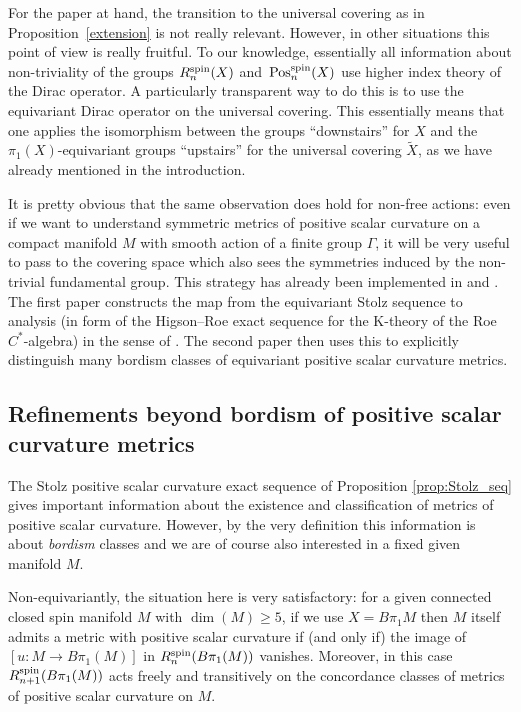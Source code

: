 \documentclass[pdftex]{sigma}
\numberwithin{equation}{section}
\begin{document}
	\begin{Remark}
		For the paper at hand, the transition to the universal covering as in
		Proposition~\ref{extension} is not really relevant. However, in other
		situations this point of view is really fruitful. To our knowledge,
		essentially all information about non-triviality of the groups
		$R^{\rm spin}_n(X)$ and~$\mathrm{Pos}_n^{\rm spin}(X)$ use higher index theory of the Dirac
		operator. A particularly transparent way to do this is to use the
		equivariant Dirac operator on the universal covering. This essentially means
		that one applies the isomorphism between the groups ``downstairs'' for $X$ and the
		$\pi_1(X)$-equivariant groups ``upstairs'' for the universal covering
		$\tilde X$, as we have already mentioned in the introduction.
		
		It
		is pretty obvious that the same observation does hold for non-free actions: even
		if we want to understand symmetric metrics of positive scalar curvature on a
		compact manifold $M$ with smooth action of a finite group $\Gamma$, it will
		be very useful to pass to the covering space which also sees the symmetries
		induced by the non-trivial fundamental group. This strategy has already been
		implemented in \cite[Section 5]{XieYu}
		and \cite{XieYuZeidler}. The first paper constructs the map from the
		equivariant
		Stolz sequence to analysis (in form of the Higson--Roe exact sequence for the
		K-theory of the Roe $C^*$-algebra) in the
		sense of \cite{PiazzaSchick}. The second paper then uses this to explicitly
		distinguish many bordism classes of equivariant positive scalar curvature
		metrics.
	\end{Remark}
	
	
	\subsection{Refinements beyond bordism of positive scalar curvature metrics}
	
	The Stolz positive scalar curvature exact sequence of Proposition
	\ref{prop:Stolz_seq} gives important information about the existence and
	classification of metrics of positive scalar curvature. However, by the very
	definition this information is about \emph{bordism} classes and we are of
	course also interested in a fixed given manifold $M$.
	
	Non-equivariantly, the situation here is very satisfactory: for a given
	connected closed spin manifold $M$ with $\dim(M)\ge 5$, if we use $X=B\pi_1M$
	then $M$ itself admits a metric with positive scalar curvature if (and only
	if) the image of $[u\colon M\to B\pi_1(M)]$ in $R_n^{\rm spin}(B\pi_1(M))$
	vanishes. Moreover, in this case $R_{n+1}^{\rm spin}(B\pi_1(M))$ acts freely and
	transitively on the concordance classes of metrics of positive scalar
	curvature on $M$.
	
\end{document}
